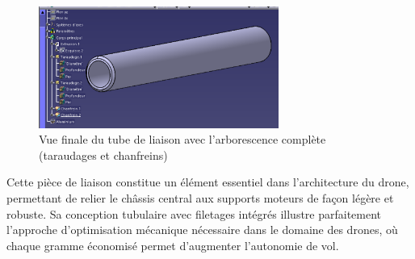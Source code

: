 \documentclass[a4paper,12pt]{report}
\begin{document}
\begin{figure}[H]
    \centering
    \includegraphics[width=0.7\textwidth]{images/tube_liaison_complet.png}
    \caption{Vue finale du tube de liaison avec l'arborescence complète (taraudages et chanfreins)}
    \label{fig:tube_liaison_arborescence}
\end{figure}

Cette pièce de liaison constitue un élément essentiel dans l'architecture du drone, permettant de relier le châssis central aux supports moteurs de façon légère et robuste. Sa conception tubulaire avec filetages intégrés illustre parfaitement l'approche d'optimisation mécanique nécessaire dans le domaine des drones, où chaque gramme économisé permet d'augmenter l'autonomie de vol.
\end{document}
